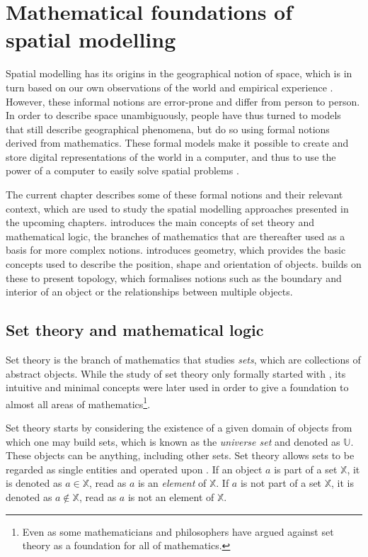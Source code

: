 
\chapter{Mathematical foundations of spatial modelling}
\label{ch:modelling-mathematics}

Spatial modelling has its origins in the geographical notion of space, which is in turn based on our own observations of the world and empirical experience \citep{Couclelis99}.
However, these informal notions are error-prone and differ from person to person.
In order to describe space unambiguously, people have thus turned to models that still describe geographical phenomena, but do so using formal notions derived from mathematics.
These formal models make it possible to create and store digital representations of the world in a computer, and thus to use the power of a computer to easily solve spatial problems \citep{Burrough86,Bailey95}.

The current chapter describes some of these formal notions and their relevant context, which are used to study the spatial modelling approaches presented in the upcoming chapters.
 introduces the main concepts of set theory and mathematical logic, the branches of mathematics that are thereafter used as a basis for more complex notions.
 introduces geometry, which provides the basic concepts used to describe the position, shape and orientation of objects.
 builds on these to present topology, which formalises notions such as the boundary and interior of an object or the relationships between multiple objects.

\section{Set theory and mathematical logic}
\label{se:settheory}

Set theory is the branch of mathematics that studies \emph{sets}, which are collections of abstract objects.
While the study of set theory only formally started with \citet{Cantor74}, its intuitive and minimal concepts were later used in order to give a foundation to almost all areas of mathematics\footnote{Even as some mathematicians and philosophers have argued against set theory as a foundation for all of mathematics.}.

Set theory starts by considering the existence of a given domain of objects from which one may build sets, which is known as the \emph{universe set} and denoted as $\mathbb{U}$.
These objects can be anything, including other sets.
Set theory allows sets to be regarded as single entities and operated upon \citep{Devlin93}.
If an object $a$ is part of a set $\mathbb{X}$, it is denoted as $a \in \mathbb{X}$, read as $a$ is an \emph{element} of $\mathbb{X}$.
If $a$ is not part of a set $\mathbb{X}$, it is denoted as $a \notin \mathbb{X}$, read as $a$ is not an element of $\mathbb{X}$.

